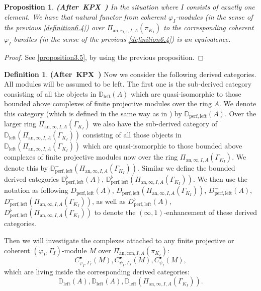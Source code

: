 \documentclass[12pt]{amsart}
\newtheorem{proposition}[theorem]{Proposition}
\theoremstyle{definition}
\newtheorem{definition}[theorem]{Definition}
\numberwithin{equation}{section}
\begin{document}
\begin{proposition} \mbox{\bf{(After KPX \cite[Proposition 2.2.7]{KPX})}}
In the situation where $I$ consists of exactly one element. We have that natural functor from coherent $\varphi_I$-modules (in the sense of the previous \cref{definition6.4}) over $\Pi_{\mathrm{an},r_{I,0},I,A}(\pi_{K_I})$ to the corresponding coherent $\varphi_I$-bundles (in the sense of the previous \cref{definition6.4}) is an equivalence.	
\end{proposition}

\begin{proof}
See \cref{proposition3.5}, by using the previous proposition.	
\end{proof}


\begin{definition} \mbox{\bf{(After KPX \cite[Notation 4.1.2]{KPX})}}
Now we consider the following derived categories. All modules will be assumed to be left. The first one is the sub-derived category consisting of all the objects in $\mathbb{D}_\mathrm{left}(A)$ which are quasi-isomorphic to those bounded above complexes of finite projective modules over the ring $A$. We denote this category (which is defined in the same way as in \cite[Notation 4.1.2]{KPX}) by $\mathbb{D}^-_\mathrm{perf,left}(A)$. Over the larger ring $\Pi_{\mathrm{an},\infty,I,A}(\Gamma_{K_I})$ we also have the sub-derived category of $\mathbb{D}_\mathrm{left}(\Pi_{\mathrm{an},\infty,I,A}(\Gamma_{K_I}))$ consisting of all those objects in $\mathbb{D}_\mathrm{left}(\Pi_{\mathrm{an},\infty,I,A}(\Gamma_{K_I}))$ which are quasi-isomorphic to those bounded above complexes of finite projective modules now over the ring $\Pi_{\mathrm{an},\infty,I,A}(\Gamma_{K_I})$. We denote this by $\mathbb{D}^-_\mathrm{perf,left}(\Pi_{\mathrm{an},\infty,I,A}(\Gamma_{K_I}))$. Similar we define the bounded derived categories $\mathbb{D}^\flat_\mathrm{perf,left}(A)$, $\mathbb{D}^\flat_\mathrm{perf,left}(\Pi_{\mathrm{an},\infty,I,A}(\Gamma_{K_I}))$. We then use the notation as following $D_\mathrm{perf,left}(A)$, $D_\mathrm{perf,left}(\Pi_{\mathrm{an},\infty,I,A}(\Gamma_{K_I}))$, $D^-_\mathrm{perf,left}(A)$, $D^-_\mathrm{perf,left}(\Pi_{\mathrm{an},\infty,I,A}(\Gamma_{K_I}))$, as well as $D^\flat_\mathrm{perf,left}(A)$, $D^\flat_\mathrm{perf,left}(\Pi_{\mathrm{an},\infty,I,A}(\Gamma_{K_I}))$ to denote the $(\infty, 1)$-enhancement of these derived categories.
\end{definition}


\indent Then we will investigate the complexes attached to any finite projective or coherent $(\varphi_I,\Gamma_I)$-module $M$ over $\Pi_{\mathrm{an},\mathrm{con},I,A}(\pi_{K_I})$:
\begin{displaymath}
C^\bullet_{\varphi_I,\Gamma_I}(M), C^\bullet_{\psi_I,\Gamma_I}(M),C^\bullet_{\psi_I}(M),	
\end{displaymath}
which are living inside the corresponding derived categories:
\begin{displaymath}
\mathbb{D}_\mathrm{left}(A),\mathbb{D}_\mathrm{left}(A),\mathbb{D}_\mathrm{left}(\Pi_{\mathrm{an},\infty,I,A}(\Gamma_{K_I})).	
\end{displaymath}
\end{document}
